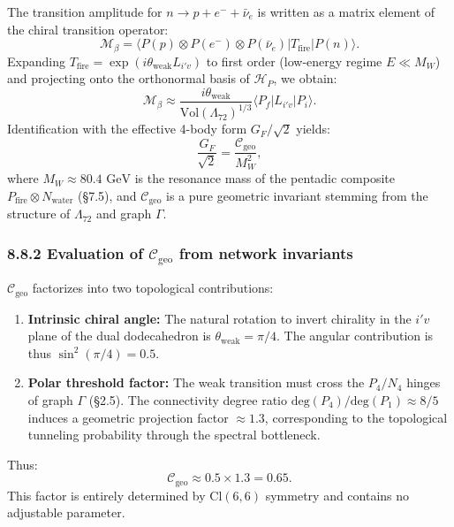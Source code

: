 \documentclass[11pt]{article}
\providecommand{\tightlist}{\setlength{\itemsep}{2pt}\setlength{\parskip}{6pt}}
\let\oldmathcal\mathcal
\renewcommand{\mathcal}[1]{\oldmathcal{#1}}
\providecommand{\tightlist}{%
  \setlength{\itemsep}{2pt}\setlength{\parskip}{6pt}
}
\begin{document}
The transition amplitude for \(n \to p + e^- + \bar{\nu}_e\) is written
as a matrix element of the chiral transition operator: \[
\mathcal{M}_{\beta} = \langle P(p) \otimes P(e^-) \otimes P(\bar{\nu}_e) | T_{\text{fire}} | P(n) \rangle.
\] Expanding \(T_{\text{fire}} = \exp(i\theta_{\text{weak}} L_{i'v})\)
to first order (low-energy regime \(E \ll M_W\)) and projecting onto the
orthonormal basis of \(\mathcal{H}_P\), we obtain: \[
\mathcal{M}_{\beta} \approx \frac{i\theta_{\text{weak}}}{\text{Vol}(\Lambda_{72})^{1/3}} \langle P_f | L_{i'v} | P_i \rangle.
\] Identification with the effective 4-body form \(G_F/\sqrt{2}\)
yields: \[
\frac{G_F}{\sqrt{2}} = \frac{\mathcal{C}_{\text{geo}}}{M_W^2},
\] where \(M_W \approx 80.4 \text{ GeV}\) is the resonance mass of the
pentadic composite \(P_{\text{fire}} \otimes N_{\text{water}}\) (§7.5),
and \(\mathcal{C}_{\text{geo}}\) is a pure geometric invariant stemming
from the structure of \(\Lambda_{72}\) and graph \(\Gamma\).

\hypertarget{evaluation-of-mathcalc_textgeo-from-network-invariants}{%
\subsubsection{\texorpdfstring{8.8.2 Evaluation of
\(\mathcal{C}_{\text{geo}}\) from network
invariants}{8.8.2 Evaluation of \textbackslash mathcal\{C\}\_\{\textbackslash text\{geo\}\} from network invariants}}\label{evaluation-of-mathcalc_textgeo-from-network-invariants}}

\(\mathcal{C}_{\text{geo}}\) factorizes into two topological
contributions:

\begin{enumerate}
\def\labelenumi{\arabic{enumi}.}
\tightlist
\item
  \textbf{Intrinsic chiral angle:} The natural rotation to invert
  chirality in the \(i'v\) plane of the dual dodecahedron is
  \(\theta_{\text{weak}} = \pi/4\). The angular contribution is thus
  \(\sin^2(\pi/4) = 0.5\).
\item
  \textbf{Polar threshold factor:} The weak transition must cross the
  \(P_4/N_4\) hinges of graph \(\Gamma\) (§2.5). The connectivity degree
  ratio \(\text{deg}(P_4)/\text{deg}(P_1) \approx 8/5\) induces a
  geometric projection factor \(\approx 1.3\), corresponding to the
  topological tunneling probability through the spectral bottleneck.
\end{enumerate}

Thus: \[
\mathcal{C}_{\text{geo}} \approx 0.5 \times 1.3 = 0.65.
\] This factor is entirely determined by \(\text{Cl}(6,6)\) symmetry and
contains no adjustable parameter.
\end{document}
